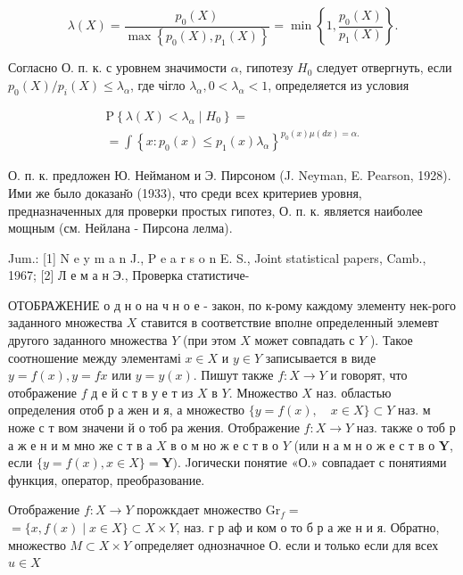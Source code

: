 \documentclass[10pt]{article}
\begin{document}
\[

\lambda(X)=\frac{p_{0}(X)}{\max \left\{p_{0}(X), p_{1}(X)\right\}}=\min \left\{1, \frac{p_{0}(X)}{p_{1}(X)}\right\} .

\]



Согласно О. п. к. с уровнем значимости $\alpha$, гипотезу $H_{0}$ следует отвергнуть, если $p_{0}(X) / p_{i}(X) \leqslant \lambda_{\alpha}$, где чігло $\lambda_{\alpha}, 0<\lambda_{\alpha}<1$, определяется из условия



\[

\begin{gathered}

\mathrm{P}\left\{\lambda(X)<\lambda_{\alpha} \mid H_{0}\right\}= \\

=\int\left\{x: p_{0}(x) \leqslant p_{1}(x) \lambda_{\alpha}\right\}^{p_{0}(x) \mu(d x)=\alpha .}

\end{gathered}

\]



О. п. к. предложен Ю. Нейманом и Э. Пирсоном (J. Neyman, E. Pearson, 1928). Ими же было доказан̆о (1933), что среди всех критериев уровня, предназначенных для проверки простых гипотез, О. п. к. является наиболее мощным (см. Нейлана - Пирсона лелма).



Jum.: [1] N e y m a n J., P e a r s o n E. S., Joint statistical papers, Camb., 1967; [2] Л е м а н Э., Проверка статистиче-



ОТОБРАЖЕНИЕ о д н о на ч н о е - закон, по к-рому каждому элементу нек-рого заданного множества $X$ ставится в соответствие вполне определенный элемевт другого заданного множества $Y$ (при этом $X$ может совпадать с $Y$ ). Такое соотношение между элементамі $x \in X$ и $y \in Y$ записывается в виде $y=f(x), y=f x$ или $y=y(x)$. Пишут также $f: X \rightarrow Y$ и говорят, что отображение $f$ д е й с т в у е т из $X$ в $Y$. Множество $X$ наз. областью определения отоб р а жен и я, а множество $\{y=f(x), \quad x \in X\} \subset Y$ наз. м ноже с т вом значени й о тоб ра жения. Отображение $f: X \rightarrow Y$ наз. также о тоб р а ж е н и м мно же с т в а $X$ в о м но ж е с т в о $Y$ (или н а м н о ж е с т в о $\boldsymbol{Y}$, если $\{y=f(x), x \in X\}=\boldsymbol{Y})$. Jогически понятие «О.» совпадает с понятиями функция, оператор, преобразование.



Отображение $f: X \rightarrow Y$ порожкдает множество $\mathrm{Gr}_{f}=$ $=\{x, f(x) \mid x \in X\} \subset X \times Y$, наз. г р аф и ком о то б р а же н и я. Обратно, множество $M \subset X \times Y$ определяет однозначное $О$. если и только если для всех $u \in X$
\end{document}

